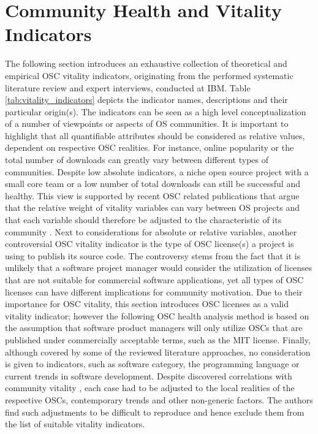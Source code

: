 \documentclass[final,5p,times,twocolumn]{elsarticle}
\begin{document}
\section{Community Health and Vitality Indicators}
\label{OSC_vitality_section}
The following section introduces an exhaustive collection of theoretical and empirical OSC vitality indicators, originating from the performed systematic literature review and expert interviews, conducted at IBM. Table \ref{tab:vitality_indicators} depicts the indicator names, descriptions and their particular origin(s). The indicators can be seen as a high level conceptualization of a number of viewpoints or aspects of OS communities. It is important to highlight that all quantifiable attributes should be considered as relative values, dependent on respective OSC realities. For instance, online popularity or the total number of downloads can greatly vary between different types of communities. Despite low absolute indicators, a niche open source project with a small core team or a low number of total downloads can still be successful and healthy. This view is supported by recent OSC related publications that argue that the relative weight of vitality variables can vary between OS projects and that each variable should therefore be adjusted to the characteristic of its community \cite{Wahyudin2007}. Next to considerations for absolute or relative variables, another controversial OSC vitality indicator is the type of OSC license(s) a project is using to publish its source code. The controversy stems from the fact that it is unlikely that a software project manager would consider the utilization of licenses that are not suitable for commercial software applications, yet all types of OSC licenses can have different implications for community motivation. Due to their importance for OSC vitality, this section introduces OSC licenses as a valid vitality indicator; however the following OSC health analysis method is based on the assumption that software product managers will only utilize OSCs that are published under commercially acceptable terms, such as the MIT license. Finally, although covered by some of the reviewed literature approaches, no consideration is given to indicators, such as software category, the programming language or current trends in software development. Despite discovered correlations with community vitality \cite{Stewart2006}, each case had to be adjusted to the local realities of the respective OSCs, contemporary trends and other non-generic factors. The authors find such adjustments to be difficult to reproduce and hence exclude them from the list of suitable vitality indicators.
\end{document}
